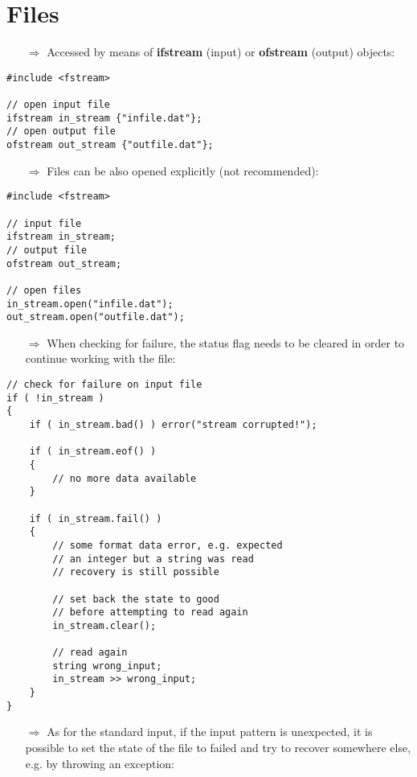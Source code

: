 \documentclass[10pt]{article}
\begin{document}
\section{Files}
\small
\begin{enumerate}
\item[$\Rightarrow$] Accessed by means of \textbf{ifstream} (input) or
\textbf{ofstream} (output) objects:
\end{enumerate}
\begin{lstlisting}
#include <fstream>

// open input file 
ifstream in_stream {"infile.dat"};
// open output file
ofstream out_stream {"outfile.dat"};
\end{lstlisting}
\begin{enumerate}
\item[$\Rightarrow$] Files can be also opened explicitly (not recommended):
\end{enumerate}
\begin{lstlisting}
#include <fstream>

// input file 
ifstream in_stream;
// output file
ofstream out_stream;

// open files
in_stream.open("infile.dat");
out_stream.open("outfile.dat");
\end{lstlisting}
\begin{enumerate}
\item[$\Rightarrow$] When checking for failure, the status flag needs to be cleared
in order to continue working with the file:
\end{enumerate}
\begin{lstlisting}
// check for failure on input file
if ( !in_stream )
{
    if ( in_stream.bad() ) error("stream corrupted!");
    
    if ( in_stream.eof() )
    { 
        // no more data available
    }
    
    if ( in_stream.fail() )
    {
        // some format data error, e.g. expected
        // an integer but a string was read
        // recovery is still possible
        
        // set back the state to good 
        // before attempting to read again
        in_stream.clear();
        
        // read again
        string wrong_input;
        in_stream >> wrong_input;
    }
}
\end{lstlisting}
\begin{enumerate}
\item[$\Rightarrow$] As for the standard input, if the input pattern is unexpected, it is possible to set the state of the file to failed
and try to recover somewhere else, e.g. by throwing an exception:
\end{enumerate}
\end{document}
